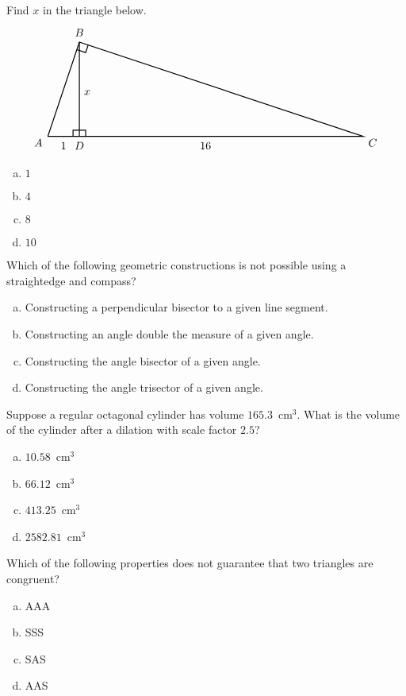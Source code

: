 \documentclass[12pt,letterpaper]{exam}
\begin{document}
\begin{questions}
\newpage



\question Find $x$ in the triangle below. 
	\[
	\begin{tikzpicture}
	\draw[line width=0.03cm] (0,0) -- (1,3) -- (10,0) -- (0,0);
	\draw[line width=0.03cm] (1,3) -- (1,0);
	\draw[line width=0.03cm] (0.8,0) -- (0.8,0.2) -- (1.2,0.2) -- (1.2,0);
	\draw[line width=0.03cm] (0.92,2.76) -- (1.2,2.666) -- (1.2802,2.9066);
	\node at (-0.3,-0.2) {$A$};
	\node at (1,3.3) {$B$};
	\node at (10.3,-0.2) {$C$};
	\node at (1,-0.3) {$D$};
	\node at (0.5,-0.3) {$1$};
	\node at (1.25,1.4) {$x$};
	\node at (5,-0.3) {$16$};
	\end{tikzpicture}
	\] 

\begin{enumerate}[(a)]
\item $1$
\item $4$
\item $8$
\item $10$
\end{enumerate} \vfill



\question Which of the following geometric constructions is not possible using a straightedge and compass?
	\begin{enumerate}[(a)]
	\item Constructing a perpendicular bisector to a given line segment. 
	\item Constructing an angle double the measure of a given angle. 
	\item Constructing the angle bisector of a given angle. 
	\item Constructing the angle trisector of a given angle. 
	\end{enumerate} \vfill



\question Suppose a regular octagonal cylinder has volume $165.3$~cm$^3$. What is the volume of the cylinder after a dilation with scale factor $2.5$?
	\begin{enumerate}[(a)]
	\item $10.58$~cm$^3$
	\item $66.12$~cm$^3$
	\item $413.25$~cm$^3$
	\item $2582.81$~cm$^3$
	\end{enumerate} \vfill



\question Which of the following properties does not guarantee that two triangles are congruent?
	\begin{enumerate}[(a)]
	\item AAA
	\item SSS
	\item SAS
	\item AAS
	\end{enumerate} \vfill




\end{questions}
\end{document}
